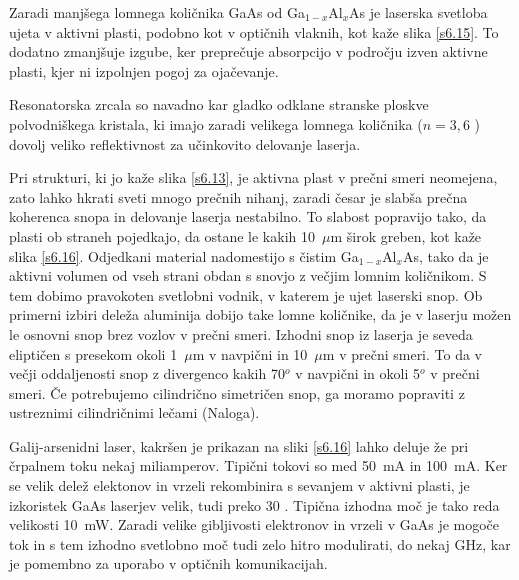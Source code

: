 Zaradi manjšega lomnega količnika GaAs od Ga$_{1- x}$Al$_x$As je laserska
svetloba ujeta v aktivni plasti, podobno kot v optičnih vlaknih, kot kaže
slika \ref{s6.15}. To dodatno zmanjšuje izgube, ker preprečuje absorpcijo
v področju izven aktivne plasti, kjer ni izpolnjen pogoj za ojačevanje.

Resonatorska zrcala so navadno kar gladko odklane stranske ploskve
polvodniškega kristala, ki imajo zaradi velikega lomnega količnika ($n=3,6$%
) dovolj veliko reflektivnost za učinkovito delovanje laserja.

Pri strukturi, ki jo kaže slika \ref{s6.13}, je aktivna plast v prečni
smeri neomejena, zato lahko hkrati sveti mnogo prečnih nihanj, zaradi
česar je slabša prečna koherenca snopa in delovanje laserja nestabilno.
To slabost popravijo tako, da plasti ob straneh pojedkajo, da ostane le
kakih 10~$\mu$m širok greben, kot kaže slika \ref{s6.16}. Odjedkani
material nadomestijo s čistim Ga$_{1-x}$Al$_x$As, tako da je aktivni
volumen od vseh strani obdan s snovjo z večjim lomnim količnikom. S tem
dobimo pravokoten svetlobni vodnik, v katerem je ujet laserski snop. Ob
primerni izbiri deleža aluminija dobijo take lomne količnike, da je v
laserju možen le osnovni snop brez vozlov v prečni smeri. Izhodni snop iz
laserja je seveda eliptičen s presekom okoli 1~$\mu$m v navpični in 10~$\mu
$m v prečni smeri. To da v večji oddaljenosti snop z divergenco kakih 70$^o
$ v navpični in okoli 5$^o$ v prečni smeri. Če potrebujemo cilindrično
simetričen snop, ga moramo popraviti z ustreznimi cilindričnimi lečami
(Naloga).

Galij-arsenidni laser, kakršen je prikazan na sliki \ref{s6.16} lahko
deluje že pri črpalnem toku nekaj miliamperov. Tipični tokovi so med
50~mA in 100~mA. Ker se velik delež elektonov in vrzeli rekombinira s
sevanjem v aktivni plasti, je izkoristek GaAs laserjev velik, tudi preko 30
. Tipična izhodna moč je tako reda velikosti
10~mW. Zaradi velike gibljivosti elektronov in vrzeli v GaAs je mogoče tok
in s tem izhodno svetlobno moč tudi zelo hitro modulirati, do nekaj GHz,
kar je pomembno za uporabo v optičnih komunikacijah.

